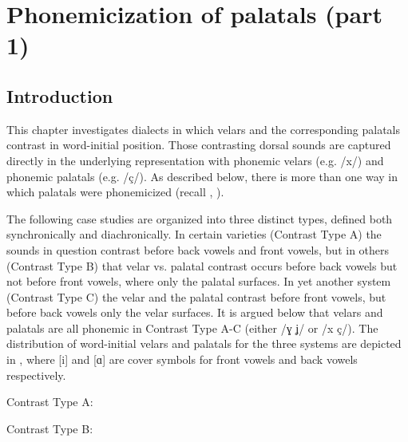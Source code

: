 \chapter{Phonemicization of palatals (part 1)}\label{sec:8}

\section{Introduction}\label{sec:8.1}

This chapter investigates dialects in which velars and the corresponding palatals contrast in word-initial position. Those contrasting dorsal sounds are captured directly in the underlying representation with phonemic velars (e.g. /x/) and phonemic palatals (e.g. /ç/). As described below, there is more than one way in which palatals were phonemicized (recall , ).

The following case studies are organized into three distinct types, defined both synchronically and diachronically. In certain varieties (Contrast Type A) the sounds in question contrast before back vowels and front vowels, but in others (Contrast Type B) that velar vs. palatal contrast occurs before back vowels but not before front vowels, where only the palatal surfaces. In yet another system (Contrast Type C) the velar and the palatal contrast before front vowels, but before back vowels only the velar surfaces. It is argued below that velars and palatals are all phonemic in Contrast Type A-C (either /ɣ ʝ/ or /x ç/). The distribution of word-initial velars and palatals for the three systems are depicted in , where [i] and [ɑ] are cover symbols for front vowels and back vowels respectively.

\ea%
\label{ex:8:1}

\ea\label{ex:8:1a}
Contrast Type A: \smallskip\\
\fbox{
\begin{tabular}{@{}ll@{}}
 \textsubscript{wd}[ [ʝi...] & \textsubscript{wd}[ [ʝɑ…]  \\
 \textsubscript{wd}[ [ɣi...] & \textsubscript{ wd}[ [ɣɑ…] 
\end{tabular}
}

\ex\label{ex:8:1b}
Contrast Type B:\smallskip\\
\fbox{
\begin{tabular}{@{}ll@{}}
 \textsubscript{wd}[ [ʝi...] & \textsubscript{wd}[ [ʝɑ…]\\ 
 & \textsubscript{wd}[ [ɣɑ…]                          
\end{tabular}
}

